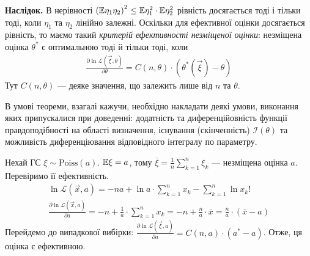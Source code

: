 \noindent\textbf{Наслідок.} В нерівності $\left( \mathbb{E}\eta_1 \eta_2 \right)^2 \leq \mathbb{E}\eta_1^2 \cdot \mathbb{E}\eta_2^2$ рівність досягається
тоді і тільки тоді, коли $\eta_1$ та $\eta_2$ лінійно залежні. Оскільки для ефективної оцінки досягається рівність, то маємо такий 
\emph{критерій ефективності незміщеної оцінки}: незміщена оцінка $\theta^*$ є оптимальною тоді й тільки тоді, коли
\begin{gather}
    \frac{\partial\ln \mathcal{L}(\vec{\xi}, \theta)}{\partial \theta} = C(n, \theta) \cdot\left(\theta^*(\vec{\xi}) - \theta\right)
\end{gather}
Тут $C(n, \theta)$ --- деяке значення, що залежить лише від $n$ та $\theta$.
\begin{remark}
    В умові теореми, взагалі кажучи, необхідно накладати деякі умови, виконання яких припускалися при доведенні: додатність та 
    диференційовність функції правдоподібності на області визначення,
    існування (скінченність) $\mathcal{I}(\theta)$ та можливість диференціювання відповідного інтегралу по параметру.
\end{remark}
\begin{example}
    Нехай ГС $\xi \sim \mathrm{Poiss}(a)$. $\mathbb{E}\xi = a$, тому $\overline{\xi} = \frac{1}{n}\sum\limits_{k=1}^n \xi_k$ --- 
    незміщена оцінка $a$. Перевіримо її ефективність.
    \begin{gather*}
        \ln \mathcal{L}(\vec{x}, a) = -n a + \ln a \cdot \sum\limits_{k=1}^n x_k - \sum\limits_{k=1}^n \ln{x_k!} \\
        \frac{\partial  \ln \mathcal{L}(\vec{x}, a)}{\partial a} = -n + \frac{1}{a} \cdot \sum\limits_{k=1}^n x_k = 
        -n + \frac{n}{a} \cdot \overline{x} = \frac{n}{a} \cdot(\overline{x} - a)
    \end{gather*}
    Перейдемо до випадкової вибірки: $\frac{\partial  \ln \mathcal{L}(\vec{\xi}, a)}{\partial a} = C(n, a) \cdot(a^* - a)$.
    Отже, ця оцінка є ефективною.
\end{example}

